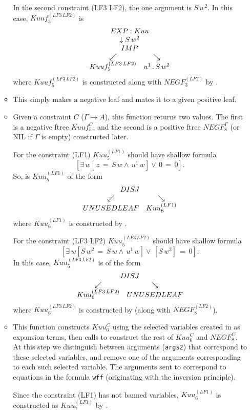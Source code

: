 \begin{enumerate}
\begin{itemize}
In the second constraint (LF3 LF2), the one argument is $S\, w^2$.
In this case, $Kuuf_3^{(LF3\, LF2)}$ is 
$${{\begin{array}[t]{c}EXP: Kuu \\ \begin{array}[t]{c} \downarrow S\, w^2 \\ {{\begin{array}[t]{c}IMP \\ \begin{array}[t]{cc} \swarrow & \searrow \\ Kuuf_5^{(LF3\, LF2)} & u^1\, . \,S\, w^2 \end{array}\end{array}}}\end{array}\end{array}}}$$
where $Kuuf_5^{(LF3\, LF2)}$ is constructed
along with $NEGF_3^{(LF2)}$
by .

\item {\bf {}}  This simply makes
a negative leaf and mates it to a given positive leaf.

\item {\bf {}}  Given a constraint
$C$ ($\Gamma\rightarrow A$),
this function returns two values.  The first is a negative ftree 
$Kuuf_5^C$, and the second is a positive ftree $NEGF_8^\Gamma$ (or NIL if $\Gamma$ is empty)
constructed later.

For the constraint (LF1) $Kuu_5^{(LF1)}$ should have shallow formula
$$[\exists \,w [ \,z \,= \,S \,w \land \,u^1 \,w] \lor \,0 \,= \,0].$$
So, is $Kuu_5^{(LF1)}$ of the form
$${{\begin{array}[t]{c}DISJ \\ \begin{array}[t]{cc} \swarrow & \searrow \\ UNUSEDLEAF & Kuu_6^{(LF1)} \end{array}\end{array}}}$$
where $Kuu_6^{(LF1)}$ is constructed by .

For the constraint (LF3 LF2) $Kuu_5^{(LF3\, LF2)}$ should have shallow formula
$$[\exists \,w [ S\, w^2 \,= \,S \,w \land \,u^1 \,w] \lor \,[S\,w^2] \,= \,0].$$
In this case, $Kuu_5^{(LF3\, LF2)}$ is of the form
$${{\begin{array}[t]{c}DISJ \\ \begin{array}[t]{cc} \swarrow & \searrow \\ Kuu_6^{(LF3\, LF2)} & UNUSEDLEAF \end{array}\end{array}}}$$
where $Kuu_6^{(LF3\, LF2)}$ is constructed by 
(along with $NEGF_8^{(LF2)}$).

\item {\bf {}}  This function
constructs $Kuu_6^C$ using the selected variables created in
 as expansion terms,
then calls  to construct
the rest of $Kuu_6^C$ and $NEGF_8^C$.  At this step we distinguish
between arguments (\verb+args2+) that correspond to these selected variables,
and remove one of the arguments corresponding to each such selected variable.
The arguments sent to  correspond
to equations in the formula \verb+wff+ (originating with the inversion principle).

Since the constraint (LF1) has not banned variables, $Kuu_6^{(LF1)}$ 
is constructed as $Kuu_7^{(LF1)}$ 
by .


\end{itemize}
\end{enumerate}
